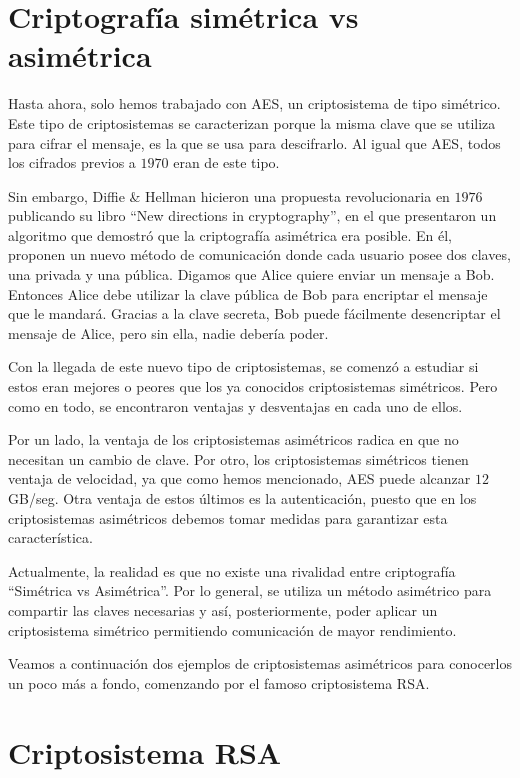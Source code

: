     \newpage
 
    \section{Criptografía simétrica vs asimétrica} \label{sec:1.3}

    Hasta ahora, solo hemos trabajado con AES, un criptosistema de tipo simétrico. Este tipo de criptosistemas se caracterizan porque la misma clave que se utiliza para cifrar el mensaje, es la que se usa para descifrarlo. Al igual que AES, todos los cifrados previos a $1970$ eran de este tipo. 
    
    Sin embargo, Diffie \& Hellman \cite{artDH} hicieron una propuesta revolucionaria en $1976$ publicando su libro ``New directions in cryptography'', en el que presentaron un algoritmo que demostró que la criptografía asimétrica era posible. En él, proponen un nuevo método de comunicación donde cada usuario posee dos claves, una privada y una pública. Digamos que Alice quiere enviar un mensaje a Bob. Entonces Alice debe utilizar la clave pública de Bob para encriptar el mensaje que le mandará. Gracias a la clave secreta, Bob puede fácilmente desencriptar el mensaje de Alice, pero sin ella, nadie debería poder.
    
    Con la llegada de este nuevo tipo de criptosistemas, se comenzó a estudiar si estos eran mejores o peores que los ya conocidos criptosistemas simétricos. Pero como en todo, se encontraron ventajas y desventajas en cada uno de ellos. 
    
    Por un lado, la ventaja de los criptosistemas asimétricos radica en que no necesitan un cambio de clave. Por otro, los criptosistemas simétricos tienen ventaja de velocidad, ya que como hemos mencionado, AES puede alcanzar $12$ GB/seg. Otra ventaja de estos últimos es la autenticación, puesto que en los criptosistemas asimétricos debemos tomar medidas para garantizar esta característica. 

    Actualmente, la realidad es que no existe una rivalidad entre criptografía ``Simétrica vs Asimétrica''. Por lo general, se utiliza un método asimétrico para compartir las claves necesarias y así, posteriormente, poder aplicar un criptosistema simétrico permitiendo comunicación de mayor rendimiento. 
    
    Veamos a continuación dos ejemplos de criptosistemas asimétricos para conocerlos un poco más a fondo, comenzando por el famoso criptosistema RSA.

    \section{Criptosistema RSA}

